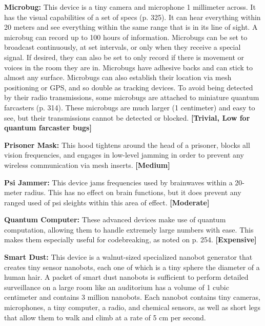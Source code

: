 \textbf{Microbug:} This device is a tiny camera and microphone 1 millimeter across. It has the visual capabilities of a set of specs (p. 325). It can hear everything within 20 meters and see everything within the same range that is in its line of sight. A microbug can record up to 100 hours of information. Microbugs can be set to broadcast continuously, at set intervals, or only when they receive a special signal. If desired, they can also be set to only record if there is movement or voices in the room they are in. Microbugs have adhesive backs and can stick to almost any surface. Microbugs can also establish their location via mesh positioning or GPS, and so double as tracking devices. To avoid being detected by their radio transmissions, some microbugs are attached to miniature quantum farcasters (p. 314). These microbugs are much larger (1 centimeter) and easy to see, but their transmissions cannot be detected or blocked. \textbf{[Trivial, Low for quantum farcaster bugs]}

\textbf{Prisoner Mask: }This hood tightens around the head of a prisoner, blocks all vision frequencies, and engages in low-level jamming in order to prevent any wireless communication via mesh inserts. \textbf{[Medium]}

\textbf{Psi Jammer:} This device jams frequencies used by brainwaves within a 20-meter radius. This has no effect on brain functions, but it does prevent any ranged used of psi sleights within this area of effect. \textbf{[Moderate]}

\textbf{Quantum Computer:} These advanced devices make use of quantum computation, allowing them to handle extremely large numbers with ease. This makes them especially useful for codebreaking, as noted on p. 254. \textbf{[Expensive]}

\textbf{Smart Dust:} This device is a walnut-sized specialized nanobot generator that creates tiny sensor nanobots, each one of which is a tiny sphere the diameter of a human hair. A packet of smart dust nanobots is sufficient to perform detailed surveillance on a large room like an auditorium has a volume of 1 cubic centimeter and contains 3 million nanobots. Each nanobot contains tiny cameras, microphones, a tiny computer, a radio, and chemical sensors, as well as short legs that allow them to walk and climb at a rate of 5 cm per second.

